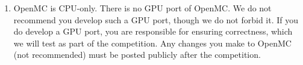 \documentclass[10pt]{article}
\begin{document}
\begin{enumerate}
\item OpenMC is CPU-only. There is no GPU port of OpenMC. We do not recommend you develop such a GPU port, though we do not forbid it. If you do develop a GPU port, you are responsible for ensuring correctness, which we will test as part of the competition. Any changes you make to OpenMC (not recommended) must be posted publicly after the competition.
\end{enumerate}
\end{document}
